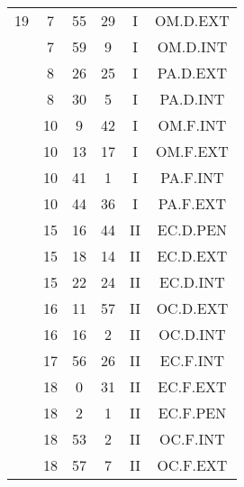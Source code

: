\documentclass[12pt, a4paper]{article}
\begin{document}
\begin{multicols}{3}
{\begin{tabular}{c c c c c c}
	 	 	 	19 & 7 & 55 & 29 & I & OM.D.EXT\\%
	 	 	 	 & 7 & 59 & 9 & I & OM.D.INT\\%
	 	 	 	 & 8 & 26 & 25 & I & PA.D.EXT\\%
	 	 	 	 & 8 & 30 & 5 & I & PA.D.INT\\%
	 	 	 	 & 10 & 9 & 42 & I & OM.F.INT\\%
	 	 	 	 & 10 & 13 & 17 & I & OM.F.EXT\\%
	 	 	 	 & 10 & 41 & 1 & I & PA.F.INT\\%
	 	 	 	 & 10 & 44 & 36 & I & PA.F.EXT\\%
	 	 	 	 & 15 & 16 & 44 & II & EC.D.PEN\\%
	 	 	 	 & 15 & 18 & 14 & II & EC.D.EXT\\%
	 	 	 	 & 15 & 22 & 24 & II & EC.D.INT\\%
	 	 	 	 & 16 & 11 & 57 & II & OC.D.EXT\\%
	 	 	 	 & 16 & 16 & 2 & II & OC.D.INT\\%
	 	 	 	 & 17 & 56 & 26 & II & EC.F.INT\\%
	 	 	 	 & 18 & 0 & 31 & II & EC.F.EXT\\%
	 	 	 	 & 18 & 2 & 1 & II & EC.F.PEN\\%
	 	 	 	 & 18 & 53 & 2 & II & OC.F.INT\\%
	 	 	 	 & 18 & 57 & 7 & II & OC.F.EXT\\%
	 	 \end{tabular}
 	}
\end{multicols}
\end{document}
